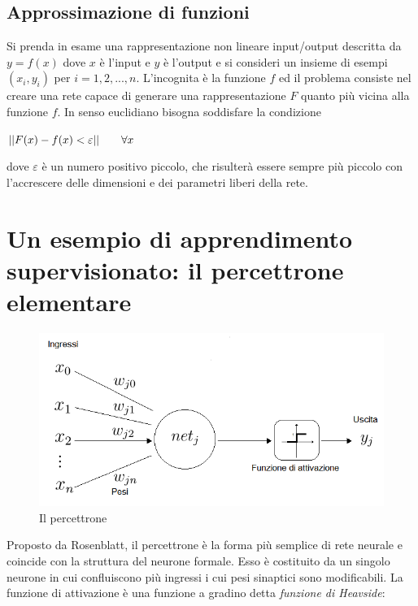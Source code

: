 \documentclass[12pt,a4paper,oneside]{book}
\begin{document}
		\subsection{Approssimazione di funzioni}
		
		Si prenda in esame una rappresentazione non lineare input/output descritta da $y=f(x)$ dove $x$ è l'input e $y$ è l'output e si consideri un insieme di esempi ${(x_{i},y_{i} )}$ per $i=1, 2, ..., n$. L'incognita è la funzione $f$ ed il problema consiste nel creare una rete capace di generare una rappresentazione $F$ quanto più vicina alla funzione $f$. In senso euclidiano bisogna soddisfare la condizione\\
		
		\begin{center} $\displaystyle ||F(x)-f(x)<\varepsilon|| \hspace{0,7cm} \forall x $ \end{center}
		
		dove $\varepsilon$ è un numero positivo piccolo, che risulterà essere sempre più piccolo con l'accrescere delle dimensioni e dei parametri liberi della rete. 
		
	

	\section{Un esempio di apprendimento supervisionato: il percettrone elementare}
	
		\begin{figure}[h]
			\centering
			\includegraphics[width=0.85\linewidth]{IMMAGINI/perceptron}
			\caption{ Il percettrone }
			\label{fig:perceptron}
		\end{figure}	
	
		Proposto da Rosenblatt, il percettrone è la forma più semplice di rete neurale e coincide con la struttura del neurone formale. Esso è costituito da un singolo neurone in cui confluiscono più ingressi i cui pesi sinaptici sono modificabili. 
		\clearpage
		La funzione di attivazione è una funzione a gradino detta \emph{funzione di Heavside}:
		
\end{document}

